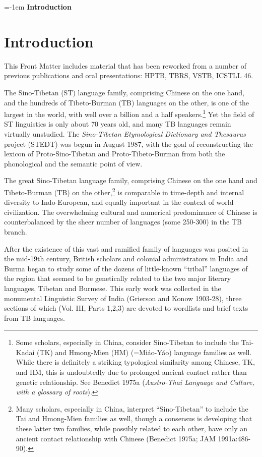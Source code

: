 {\large \parindent=-1em \textbf{Introduction}}
\vspace{0.25em}

\section{Introduction}
This Front Matter includes material that has been reworked from a number of previous publications and oral presentations: HPTB, TBRS, VSTB, ICSTLL 46.

The Sino-Tibetan (ST) language family, comprising Chinese on the one hand,
and the hundreds of Tibeto-Burman (TB) languages on the other, is one of the
largest in the world, with well over a billion and a half
speakers.\footnote{Some scholars, especially in China,
consider Sino-Tibetan to include the
Tai-Kadai (TK) and Hmong-Mien (HM) (=Miáo-Yáo) language families as well.  While
there is definitely a striking typological similarity among Chinese, TK, and HM,
this is undoubtedly due to prolonged ancient contact rather than genetic
relationship.  See Benedict 1975a (\textit{Austro-Thai Language and Culture, with a
glossary of roots}).}  Yet the field of ST linguistics is only about 70 years
old, and many TB languages remain virtually unstudied.  The \textit{Sino-Tibetan
Etymological Dictionary and Thesaurus} project (STEDT) was begun in August 1987,
with the goal of reconstructing the lexicon of Proto-Sino-Tibetan and
Proto-Tibeto-Burman from both the phonological and the semantic point of view.

The great Sino-Tibetan language family, comprising Chinese on the one hand and Tibeto-Burman (TB) on the other,\footnote{Many scholars, especially in China, interpret ``Sino-Tibetan'' to include the Tai and Hmong-Mien families as well, though a consensus is developing that these latter two families, while possibly related to each other, have only an ancient contact relationship with Chinese (Benedict 1975a; JAM 1991a:486-90).} is comparable in time-depth and internal diversity to Indo-European, and equally important in the context of world civilization. The overwhelming cultural and numerical predominance of Chinese is counterbalanced by the sheer number of languages (some 250-300) in the TB branch.

After the existence of this vast and ramified family of languages was posited in the mid-19th century, British scholars and colonial administrators in India and Burma began to study some of the dozens of little-known ``tribal'' languages of the region that seemed to be genetically related to the two major literary languages, Tibetan and Burmese. This early work was collected in the monumental Linguistic Survey of India (Grierson and Konow 1903-28), three sections of which (Vol. III, Parts 1,2,3) are devoted to wordlists and brief texts from TB languages.

